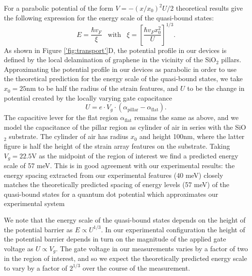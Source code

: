 \documentclass[edeposit,fullpage,draftthesis]{uiucthesis2009}
\begin{document}
            For a parabolic potential of the form $V = − (x/x_0)^2 U/2$
            theoretical results \cite{silvestrov2007quantum} give the following expression for the energy scale of the
            quasi-bound states:
            \begin{equation}
                E = \frac{\hbar v_F}{\xi} \;\;\; \text{with} \;\;\; \xi = \left[ \frac{\hbar v_F x_0^2}{U} \right]^{1/3}.
            \end{equation}
            As shown in Figure \ref{'fig:transport'}D, the potential profile in our devices is 
            defined by the local delamination of graphene in the vicinity of the SiO$_2$ pillars.
            Approximating the potential profile in our devices as parabolic in order to use the 
            theoretical prediction for the energy scale of the quasi-bound states,
            we take $x_0=25\text{nm}$ to be half the radius of the
            strain features, and $U$ to be the change in potential created by the locally varying gate capacitance
            \begin{equation}
                U = e \cdot V_g \cdot (\alpha_\text{pillar} - \alpha_\text{flat}).
            \end{equation}
            The capacitive lever for the flat region $\alpha_\text{flat}$ remains the same as above, and we model
            the capacitance of the pillar region as cylinder of air in series with the SiO$_2$ substrate.
            The cylinder of air has radius $x_0$ and height 100nm, where the latter figure
            is half the height of the strain array features on the substrate. Taking $V_g = 22.5\text{V}$ 
            as the midpoint of the region of interest we find a predicted energy scale of 57 meV. This
            is in good agreement with our experimental results: the energy spacing extracted from our 
            experimental features (40 meV) closely matches the theoretically predicted spacing of energy levels (57 meV) of 
            the quasi-bound states for a quantum dot potential which approximates our experimental system
            
            We note that the energy scale of the quasi-bound states depends on the height of the 
            potential barrier as $E \propto U^{1/3} $. In our experimental configuration 
            the height of the potential barrier depends 
            in turn on the magnitude of the applied gate voltage as $ U \propto V_g$. 
            The gate voltage in our measurements varies by a factor of two in the region of interest,
            and so we expect the theoretically predicted energy scale to vary by a factor of $2^{1/3}$
            over the course of the measurement.
            
\end{document}
